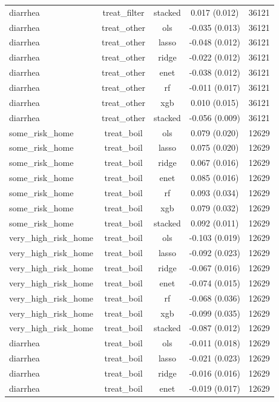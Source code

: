 \begin{table}[htbp]
\begin{tabular}{lcccc}
diarrhea & treat_filter & stacked & 0.017 (0.012) & 36121 \\
diarrhea & treat_other & ols & -0.035 (0.013) & 36121 \\
diarrhea & treat_other & lasso & -0.048 (0.012) & 36121 \\
diarrhea & treat_other & ridge & -0.022 (0.012) & 36121 \\
diarrhea & treat_other & enet & -0.038 (0.012) & 36121 \\
diarrhea & treat_other & rf & -0.011 (0.017) & 36121 \\
diarrhea & treat_other & xgb & 0.010 (0.015) & 36121 \\
diarrhea & treat_other & stacked & -0.056 (0.009) & 36121 \\
some_risk_home & treat_boil & ols & 0.079 (0.020) & 12629 \\
some_risk_home & treat_boil & lasso & 0.075 (0.020) & 12629 \\
some_risk_home & treat_boil & ridge & 0.067 (0.016) & 12629 \\
some_risk_home & treat_boil & enet & 0.085 (0.016) & 12629 \\
some_risk_home & treat_boil & rf & 0.093 (0.034) & 12629 \\
some_risk_home & treat_boil & xgb & 0.079 (0.032) & 12629 \\
some_risk_home & treat_boil & stacked & 0.092 (0.011) & 12629 \\
very_high_risk_home & treat_boil & ols & -0.103 (0.019) & 12629 \\
very_high_risk_home & treat_boil & lasso & -0.092 (0.023) & 12629 \\
very_high_risk_home & treat_boil & ridge & -0.067 (0.016) & 12629 \\
very_high_risk_home & treat_boil & enet & -0.074 (0.015) & 12629 \\
very_high_risk_home & treat_boil & rf & -0.068 (0.036) & 12629 \\
very_high_risk_home & treat_boil & xgb & -0.099 (0.035) & 12629 \\
very_high_risk_home & treat_boil & stacked & -0.087 (0.012) & 12629 \\
diarrhea & treat_boil & ols & -0.011 (0.018) & 12629 \\
diarrhea & treat_boil & lasso & -0.021 (0.023) & 12629 \\
diarrhea & treat_boil & ridge & -0.016 (0.016) & 12629 \\
diarrhea & treat_boil & enet & -0.019 (0.017) & 12629 \\

\end{tabular}
\end{table}
